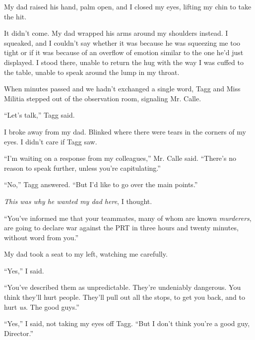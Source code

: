 My dad raised his hand, palm open, and I closed my eyes, lifting my chin to take the hit.



It didn't come.  My dad wrapped his arms around my shoulders instead.  I squeaked, and I couldn't say whether it was because he was squeezing me too tight or if it was because of an overflow of emotion similar to the one he'd just displayed.  I stood there, unable to return the hug with the way I was cuffed to the table, unable to speak around the lump in my throat.



When minutes passed and we hadn't exchanged a single word, Tagg and Miss Militia stepped out of the observation room, signaling Mr. Calle.



``Let's talk,'' Tagg said.



I broke away from my dad.  Blinked where there were tears in the corners of my eyes.  I didn't care if Tagg saw.



``I'm waiting on a response from my colleagues,'' Mr. Calle said.  ``There's no reason to speak further, unless you're capitulating.''



``No,'' Tagg answered.  ``But I'd like to go over the main points.''



\emph{This was why he wanted my dad here}, I thought.



``You've informed me that your teammates, many of whom are known \emph{murderers}, are going to declare war against the PRT in three hours and twenty minutes, without word from you.''



My dad took a seat to my left, watching me carefully.



``Yes,'' I said.



``You've described them as unpredictable.  They're undeniably dangerous.  You think they'll hurt people.  They'll pull out all the stops, to get you back, and to hurt \emph{us}.  The good guys.''



``Yes,'' I said, not taking my eyes off Tagg.  ``But I don't think you're a good guy, Director.''



